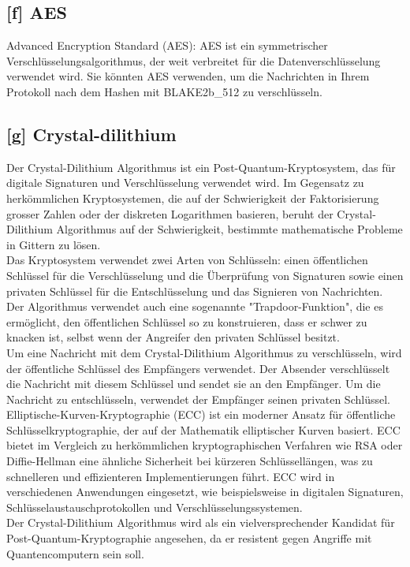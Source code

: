 \subsection*{[f] AES}
\label{glo:aes}
Advanced Encryption Standard (AES): AES ist ein symmetrischer Verschlüsselungsalgorithmus, der weit verbreitet für die Datenverschlüsselung verwendet wird. Sie könnten AES verwenden, um die Nachrichten in Ihrem Protokoll nach dem Hashen mit BLAKE2b\_512 zu verschlüsseln.
\subsection*{[g] Crystal-dilithium}
\label{glo:crystal-dilithium}
Der Crystal-Dilithium \cite{crystal} Algorithmus ist ein Post-Quantum-Kryptosystem, das für digitale Signaturen und Verschlüsselung verwendet wird. Im Gegensatz zu herkömmlichen Kryptosystemen, die auf der Schwierigkeit der Faktorisierung grosser Zahlen oder der diskreten Logarithmen basieren, beruht der Crystal-Dilithium Algorithmus auf der Schwierigkeit, bestimmte mathematische Probleme in Gittern zu lösen.\\
Das Kryptosystem verwendet zwei Arten von Schlüsseln: einen öffentlichen Schlüssel für die Verschlüsselung und die Überprüfung von Signaturen sowie einen privaten Schlüssel für die Entschlüsselung und das Signieren von Nachrichten. Der Algorithmus verwendet auch eine sogenannte "Trapdoor-Funktion", die es ermöglicht, den öffentlichen Schlüssel so zu konstruieren, dass er schwer zu knacken ist, selbst wenn der Angreifer den privaten Schlüssel besitzt.\\
Um eine Nachricht mit dem Crystal-Dilithium Algorithmus zu verschlüsseln, wird der öffentliche Schlüssel des Empfängers verwendet. Der Absender verschlüsselt die Nachricht mit diesem Schlüssel und sendet sie an den Empfänger. Um die Nachricht zu entschlüsseln, verwendet der Empfänger seinen privaten Schlüssel.\\
Elliptische-Kurven-Kryptographie (ECC) ist ein moderner Ansatz für öffentliche Schlüsselkryptographie, der auf der Mathematik elliptischer Kurven basiert. ECC bietet im Vergleich zu herkömmlichen kryptographischen Verfahren wie RSA oder Diffie-Hellman eine ähnliche Sicherheit bei kürzeren Schlüssellängen, was zu schnelleren und effizienteren Implementierungen führt. ECC wird in verschiedenen Anwendungen eingesetzt, wie beispielsweise in digitalen Signaturen, Schlüsselaustauschprotokollen und Verschlüsselungssystemen.\\
Der Crystal-Dilithium Algorithmus wird als ein vielversprechender Kandidat für Post-Quantum-Kryptographie angesehen, da er resistent gegen Angriffe mit Quantencomputern sein soll.\cite{poepelmann2018crystal}\cite{10.1145/3319535}

